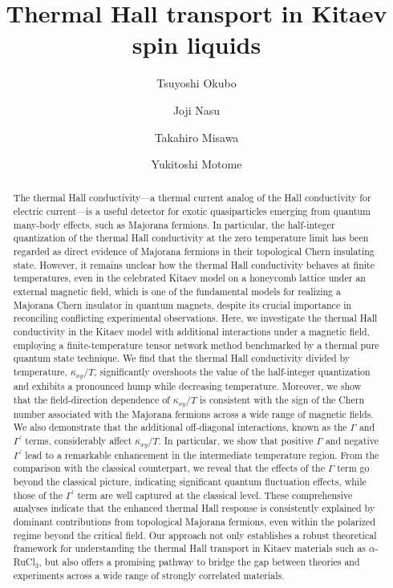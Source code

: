 \documentclass[twocolumn,superscriptaddress,showpacs, longbibliography, aps, prx]{revtex4-2}
\begin{document}
\title{Thermal Hall transport in Kitaev spin liquids}
\author{Tsuyoshi Okubo}
\author{Joji Nasu}
\author{Takahiro Misawa}
\author{Yukitoshi Motome}

\begin{abstract}
The thermal Hall conductivity---a thermal current analog of the Hall conductivity for electric current---is a useful detector for exotic quasiparticles emerging from quantum many-body effects, such as Majorana fermions.
In particular, the half-integer quantization of the thermal Hall conductivity at the zero temperature limit has been regarded as direct evidence of Majorana fermions in their topological Chern insulating state. 
However, it remains unclear how the thermal Hall conductivity behaves at finite temperatures, even in the celebrated Kitaev model on a honeycomb lattice under an external magnetic field, which is one of the fundamental models for realizing a Majorana Chern insulator in quantum magnets, despite its crucial importance in reconciling conflicting experimental observations. 
Here, we investigate the thermal Hall conductivity in the Kitaev model with additional interactions under a magnetic field, employing a finite-temperature tensor network method benchmarked by a thermal pure quantum state technique. 
We find that the thermal Hall conductivity divided by temperature, $\kappa_{xy}/T$, significantly overshoots the value of the half-integer quantization and exhibits a pronounced hump while decreasing temperature. 
Moreover, we show that the field-direction dependence of $\kappa_{xy}/T$ is consistent with the sign of the Chern number associated with the Majorana fermions across a wide range of magnetic fields. 
We also demonstrate that the additional off-diagonal interactions, known as the $\Gamma$ and $\Gamma^{\prime}$ terms, considerably affect $\kappa_{xy}/T$. 
In particular, we show that positive $\Gamma$ and negative $\Gamma^{\prime}$ lead to a remarkable enhancement in the intermediate temperature region. 
From the comparison with the classical counterpart, we reveal that the effects of the $\Gamma$ term go beyond the classical picture, indicating significant quantum fluctuation effects, while those of the $\Gamma^\prime$ term are well captured at the classical level. 
These comprehensive analyses indicate that the enhanced thermal Hall response is consistently explained by dominant contributions from topological Majorana fermions, even within the polarized regime beyond the critical field. 
Our approach not only establishes a robust theoretical framework for understanding the thermal Hall transport in Kitaev materials such as $\alpha$-RuCl$_{3}$, but also offers a promising pathway to bridge the gap between theories and experiments across a wide range of strongly correlated materials.
\end{abstract}
\end{document}
